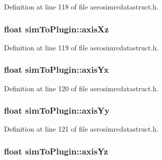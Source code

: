\-Definition at line 118 of file aerosimrcdatastruct.\-h.

\hypertarget{group___aero_sim_r_c_gaf6a11ab25129a46c7195678d223f8cba}{
\subsubsection[{axis\-Xz}]{\setlength{\rightskip}{0pt plus 5cm}float {\bf sim\-To\-Plugin\-::axis\-Xz}}}\label{group___aero_sim_r_c_gaf6a11ab25129a46c7195678d223f8cba}


\-Definition at line 119 of file aerosimrcdatastruct.\-h.

\hypertarget{group___aero_sim_r_c_gab46b6cb491df61bb0808c6a2942f5f26}{
\subsubsection[{axis\-Yx}]{\setlength{\rightskip}{0pt plus 5cm}float {\bf sim\-To\-Plugin\-::axis\-Yx}}}\label{group___aero_sim_r_c_gab46b6cb491df61bb0808c6a2942f5f26}


\-Definition at line 120 of file aerosimrcdatastruct.\-h.

\hypertarget{group___aero_sim_r_c_gab1c3f18d56d396a6dd95411539ffc0e8}{
\subsubsection[{axis\-Yy}]{\setlength{\rightskip}{0pt plus 5cm}float {\bf sim\-To\-Plugin\-::axis\-Yy}}}\label{group___aero_sim_r_c_gab1c3f18d56d396a6dd95411539ffc0e8}


\-Definition at line 121 of file aerosimrcdatastruct.\-h.

\hypertarget{group___aero_sim_r_c_ga7c0f6efcd45a801369e92067bc85a5ca}{
\subsubsection[{axis\-Yz}]{\setlength{\rightskip}{0pt plus 5cm}float {\bf sim\-To\-Plugin\-::axis\-Yz}}}\label{group___aero_sim_r_c_ga7c0f6efcd45a801369e92067bc85a5ca}


